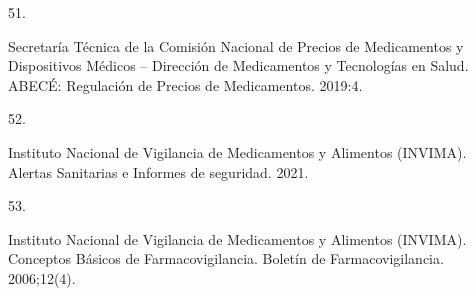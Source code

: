 \documentclass[
]{book}
\newlength{\cslhangindent}
\newlength{\csllabelwidth}
\newlength{\cslentryspacingunit} %
\newenvironment{CSLReferences}[2] %
 {%
  \setlength{\parindent}{0pt}
  \ifodd #1
  \let\oldpar\par
  \def\par{\hangindent=\cslhangindent\oldpar}
  \fi
  \setlength{\parskip}{#2\cslentryspacingunit}
 }%
 {}
\newcommand{\CSLLeftMargin}[1]{\parbox[t]{\csllabelwidth}{#1}}
\newcommand{\CSLRightInline}[1]{\parbox[t]{\linewidth - \csllabelwidth}{#1}\break}
\begin{document}
\begin{CSLReferences}{0}{0}
\leavevmode{}%
\CSLLeftMargin{51. }
\CSLRightInline{Secretaría Técnica de la Comisión Nacional de Precios de Medicamentos y Dispositivos Médicos -- Dirección de Medicamentos y Tecnologías en Salud. {ABEC{É}: Regulaci{ó}n de Precios de Medicamentos}. 2019:4.}

\leavevmode{}%
\CSLLeftMargin{52. }
\CSLRightInline{Instituto Nacional de Vigilancia de Medicamentos y Alimentos (INVIMA). {Alertas Sanitarias e Informes de seguridad}. 2021.}

\leavevmode{}%
\CSLLeftMargin{53. }
\CSLRightInline{Instituto Nacional de Vigilancia de Medicamentos y Alimentos (INVIMA). {Conceptos B{á}sicos de Farmacovigilancia}. Bolet{í}n de Farmacovigilancia. 2006;12(4).}

\end{CSLReferences}
\end{document}

